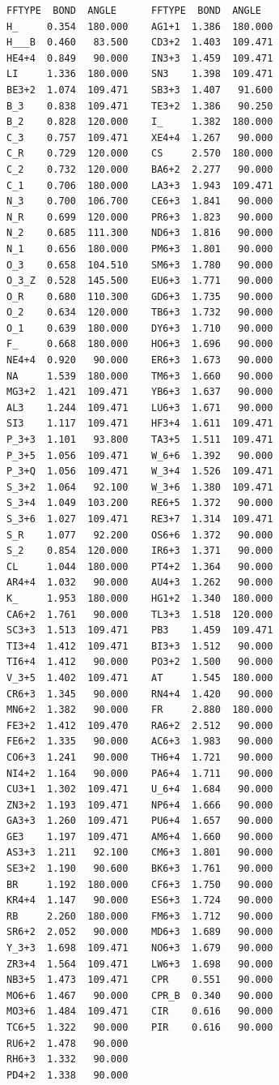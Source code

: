 \documentclass[final,12pt,makeidx,DIV=calc]{article}
\begin{document}
{{{{{{\scriptsize
\begin{verbatim}
FFTYPE  BOND  ANGLE      FFTYPE  BOND  ANGLE
H_     0.354  180.000    AG1+1  1.386  180.000
H___B  0.460   83.500 	 CD3+2  1.403  109.471
HE4+4  0.849   90.000 	 IN3+3  1.459  109.471
LI     1.336  180.000 	 SN3    1.398  109.471
BE3+2  1.074  109.471 	 SB3+3  1.407   91.600
B_3    0.838  109.471 	 TE3+2  1.386   90.250
B_2    0.828  120.000 	 I_     1.382  180.000
C_3    0.757  109.471 	 XE4+4  1.267   90.000
C_R    0.729  120.000 	 CS     2.570  180.000
C_2    0.732  120.000 	 BA6+2  2.277   90.000
C_1    0.706  180.000 	 LA3+3  1.943  109.471
N_3    0.700  106.700 	 CE6+3  1.841   90.000
N_R    0.699  120.000 	 PR6+3  1.823   90.000
N_2    0.685  111.300 	 ND6+3  1.816   90.000
N_1    0.656  180.000 	 PM6+3  1.801   90.000
O_3    0.658  104.510 	 SM6+3  1.780   90.000
O_3_Z  0.528  145.500 	 EU6+3  1.771   90.000
O_R    0.680  110.300 	 GD6+3  1.735   90.000
O_2    0.634  120.000 	 TB6+3  1.732   90.000
O_1    0.639  180.000 	 DY6+3  1.710   90.000
F_     0.668  180.000 	 HO6+3  1.696   90.000
NE4+4  0.920   90.000 	 ER6+3  1.673   90.000
NA     1.539  180.000 	 TM6+3  1.660   90.000
MG3+2  1.421  109.471 	 YB6+3  1.637   90.000
AL3    1.244  109.471 	 LU6+3  1.671   90.000
SI3    1.117  109.471 	 HF3+4  1.611  109.471
P_3+3  1.101   93.800 	 TA3+5  1.511  109.471
P_3+5  1.056  109.471 	 W_6+6  1.392   90.000
P_3+Q  1.056  109.471 	 W_3+4  1.526  109.471
S_3+2  1.064   92.100 	 W_3+6  1.380  109.471
S_3+4  1.049  103.200 	 RE6+5  1.372   90.000
S_3+6  1.027  109.471 	 RE3+7  1.314  109.471
S_R    1.077   92.200 	 OS6+6  1.372   90.000
S_2    0.854  120.000 	 IR6+3  1.371   90.000
CL     1.044  180.000 	 PT4+2  1.364   90.000
AR4+4  1.032   90.000 	 AU4+3  1.262   90.000
K_     1.953  180.000 	 HG1+2  1.340  180.000
CA6+2  1.761   90.000 	 TL3+3  1.518  120.000
SC3+3  1.513  109.471 	 PB3    1.459  109.471
TI3+4  1.412  109.471 	 BI3+3  1.512   90.000
TI6+4  1.412   90.000 	 PO3+2  1.500   90.000
V_3+5  1.402  109.471 	 AT     1.545  180.000
CR6+3  1.345   90.000 	 RN4+4  1.420   90.000
MN6+2  1.382   90.000 	 FR     2.880  180.000
FE3+2  1.412  109.470 	 RA6+2  2.512   90.000
FE6+2  1.335   90.000 	 AC6+3  1.983   90.000
CO6+3  1.241   90.000 	 TH6+4  1.721   90.000
NI4+2  1.164   90.000 	 PA6+4  1.711   90.000
CU3+1  1.302  109.471 	 U_6+4  1.684   90.000
ZN3+2  1.193  109.471 	 NP6+4  1.666   90.000
GA3+3  1.260  109.471 	 PU6+4  1.657   90.000
GE3    1.197  109.471 	 AM6+4  1.660   90.000
AS3+3  1.211   92.100 	 CM6+3  1.801   90.000
SE3+2  1.190   90.600 	 BK6+3  1.761   90.000
BR     1.192  180.000 	 CF6+3  1.750   90.000
KR4+4  1.147   90.000 	 ES6+3  1.724   90.000
RB     2.260  180.000 	 FM6+3  1.712   90.000
SR6+2  2.052   90.000 	 MD6+3  1.689   90.000
Y_3+3  1.698  109.471 	 NO6+3  1.679   90.000
ZR3+4  1.564  109.471 	 LW6+3  1.698   90.000
NB3+5  1.473  109.471 	 CPR    0.551   90.000
MO6+6  1.467   90.000 	 CPR_B  0.340   90.000
MO3+6  1.484  109.471 	 CIR    0.616   90.000
TC6+5  1.322   90.000 	 PIR    0.616   90.000
RU6+2  1.478   90.000 
RH6+3  1.332   90.000 
PD4+2  1.338   90.000 
\end{verbatim}
\normalsize

}}}}}}
\end{document}
